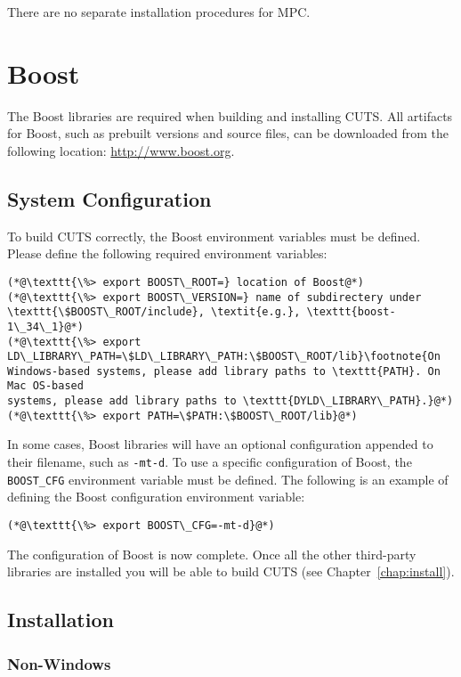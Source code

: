 There are no separate installation procedures for MPC.

\section{Boost}
\label{sec:thirdparty-boost}

The Boost libraries are required when building and installing CUTS. All
artifacts for Boost, such as prebuilt versions and source files, can be 
downloaded from the following location: \url{http://www.boost.org}. 

\subsection{System Configuration}

To build CUTS correctly, the Boost environment variables must be defined. Please 
define the following required environment variables:
\begin{lstlisting}
(*@\texttt{\%> export BOOST\_ROOT=} location of Boost@*)
(*@\texttt{\%> export BOOST\_VERSION=} name of subdirectery under \texttt{\$BOOST\_ROOT/include}, \textit{e.g.}, \texttt{boost-1\_34\_1}@*)
(*@\texttt{\%> export LD\_LIBRARY\_PATH=\$LD\_LIBRARY\_PATH:\$BOOST\_ROOT/lib}\footnote{On
Windows-based systems, please add library paths to \texttt{PATH}. On Mac OS-based
systems, please add library paths to \texttt{DYLD\_LIBRARY\_PATH}.}@*)
(*@\texttt{\%> export PATH=\$PATH:\$BOOST\_ROOT/lib}@*)
\end{lstlisting}
In some cases, Boost libraries will have an optional configuration appended to 
their filename, such as \texttt{-mt-d}. To use a specific configuration of 
Boost, the \texttt{BOOST\_CFG} environment variable must be defined. The 
following is an example of defining the Boost configuration environment 
variable:
\begin{lstlisting}
(*@\texttt{\%> export BOOST\_CFG=-mt-d}@*)
\end{lstlisting}
The configuration of Boost is now complete. Once all the other
third-party libraries are installed you will be able to build CUTS
(see Chapter~\ref{chap:install}).

\subsection{Installation}

\subsubsection{Non-Windows}
 
